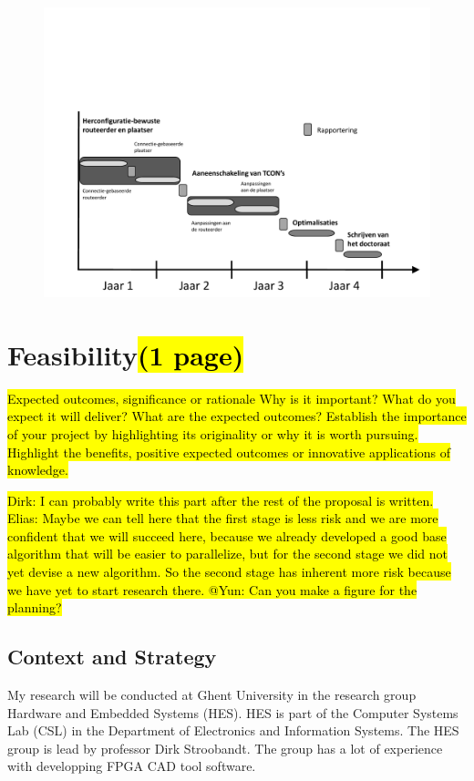 \documentclass[a4paper,oneside,12pt]{article}
\begin{document}
\begin{figure}[ht]
\centering
\includegraphics[width = \textwidth,trim = 0mm 0mm 0mm 70mm, clip]{tijdschema.pdf}
\end{figure}

\newpage
\section{Feasibility\hl{(1 page)}}
\hl{Expected outcomes, significance or rationale
Why is it important? 
What do you expect it will deliver? 
What are the expected outcomes? 
Establish the importance of your project by highlighting its originality or why it is worth pursuing. Highlight the benefits, positive expected outcomes or innovative applications of knowledge.}

\hl{Dirk: I can probably write this part after the rest of the proposal is written.\\
Elias: Maybe we can tell here that the first stage is less risk and we are more confident that we will succeed here, because we already developed a good base algorithm that will be easier to parallelize, but for the second stage we did not yet devise a new algorithm. So the second stage has inherent more risk because we have yet to start research there.
@Yun: Can you make a figure for the planning?}


\subsection{Context and Strategy}\label{context}
My research will be conducted at Ghent University in the research group Hardware and Embedded Systems (HES). HES is part of the Computer Systems Lab (CSL) in the Department of Electronics and Information Systems. The HES group is lead by professor Dirk Stroobandt. The group has a lot of experience with developping FPGA CAD tool software.
\end{document}
